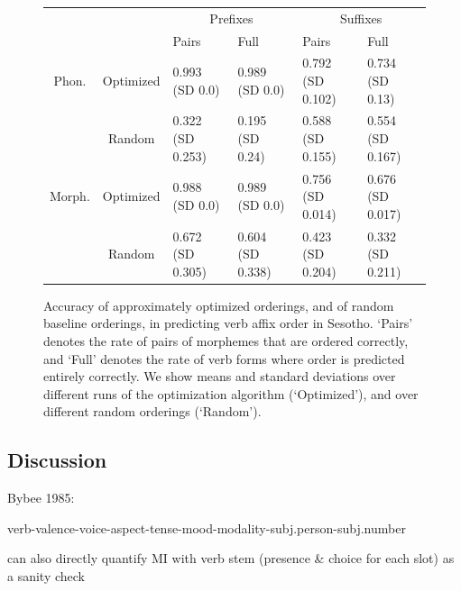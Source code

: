 \begin{figure}
\begin{tabular}{cc||ll|ll}
             &              & \multicolumn{2}{c}{Prefixes}    & \multicolumn{2}{|c}{Suffixes} \\
             &              & Pairs & Full & Pairs & Full \\ \hline\hline
Phon.   &   Optimized  &  0.993 (SD 0.0) & 0.989 (SD 0.0) & 0.792 (SD 0.102) & 0.734 (SD 0.13) \\
	& Random  &  0.322 (SD 0.253) & 0.195 (SD 0.24) & 0.588 (SD 0.155) & 0.554 (SD 0.167) \\ \hline
Morph.  &   Optimized  &  0.988 (SD 0.0) & 0.989 (SD 0.0) & 0.756 (SD 0.014) & 0.676 (SD 0.017) \\
&   Random  &  0.672 (SD 0.305) & 0.604 (SD 0.338) & 0.423 (SD 0.204) & 0.332 (SD 0.211) \\ 
\end{tabular}
\caption{Accuracy of approximately optimized orderings, and of random baseline orderings, in predicting verb affix order in Sesotho. `Pairs' denotes the rate of pairs of morphemes that are ordered correctly, and `Full' denotes the rate of verb forms where order is predicted entirely correctly. We show means and standard deviations over different runs of the optimization algorithm (`Optimized'), and over different random orderings (`Random').}\label{fig:acc-sesotho}
\end{figure}

\subsection{Discussion}


Bybee 1985:

verb-valence-voice-aspect-tense-mood-modality-subj.person-subj.number

can also directly quantify MI with verb stem (presence \& choice for each slot) as a sanity check

